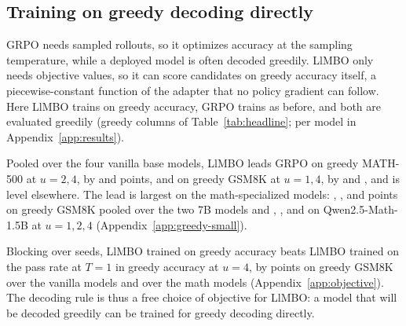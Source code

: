 \documentclass[twoside]{article}
\newcommand{\llmbo}{LlMBO}
\begin{document}
\begin{table}[t]
\centering
\caption{Single-GPU memory feasibility per architecture.
Weights in bf16. Each cell reports the number of simultaneous
full-length sequences that fit on each GPU, in \llmbo{}/GRPO order.
Green: \llmbo{} fits more.
\textcolor{red!70}{}:
the method does not fit.}
\label{tab:gpu-feasibility}
\vspace{4pt}\small\setlength{\tabcolsep}{17.5pt}

\vspace{6pt}
\end{table}

\subsection{Training on greedy decoding directly}
\label{sec:greedy-objective}
\label{sec:greedy}
\label{sec:objective}
\label{sec:ablations}

GRPO needs sampled rollouts, so it optimizes accuracy at the sampling temperature, while a deployed model is often decoded greedily. \llmbo{} only needs objective values, so it can score candidates on greedy accuracy itself, a piecewise-constant function of the adapter that no policy gradient can follow. Here \llmbo{} trains on greedy accuracy, GRPO trains as before, and both are evaluated greedily (greedy columns of Table~\ref{tab:headline}; per model in Appendix~\ref{app:results}).

Pooled over the four vanilla base models, \llmbo{} leads GRPO on greedy MATH-500 at $u = 2, 4$, by \poolGreedyGreedyUTwoMathFiveBase{} and \poolGreedyGreedyUFourMathFiveBase{} points, and on greedy GSM8K at $u = 1, 4$, by \poolGreedyGreedyUOneGsmBase{} and \poolGreedyGreedyUFourGsmBase{}, and is level elsewhere. The lead is largest on the math-specialized models: \poolGreedyGreedyUOneGsmMathVariants{}, \poolGreedyGreedyUTwoGsmMathVariants{}, and \poolGreedyGreedyUFourGsmMathVariants{} points on greedy GSM8K pooled over the two 7B models and \gapGreedyGreedyMathSmallUOneGsm{}, \gapGreedyGreedyMathSmallUTwoGsm{}, and \gapGreedyGreedyMathSmallUFourGsm{} on Qwen2.5-Math-1.5B at $u = 1, 2, 4$ (Appendix~\ref{app:greedy-small}).

Blocking over seeds, \llmbo{} trained on greedy accuracy beats \llmbo{} trained on the pass rate at $T = 1$ in greedy accuracy at $u = 4$, by \objectiveUFourGsmBase{} points on greedy GSM8K over the vanilla models and \objectiveUFourGsmMathVariants{} over the math models (Appendix~\ref{app:objective}). The decoding rule is thus a free choice of objective for \llmbo{}: a model that will be decoded greedily can be trained for greedy decoding directly.
\end{document}
